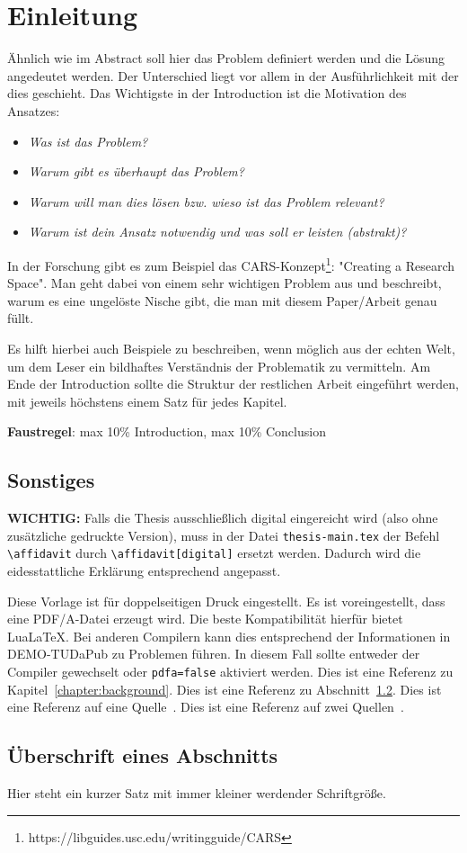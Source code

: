 
\chapter{Einleitung}\label{chapter:introduction}

Ähnlich wie im Abstract soll hier das Problem definiert werden und die Lösung angedeutet werden.
Der Unterschied liegt vor allem in der Ausführlichkeit mit der dies geschieht. 
Das Wichtigste in der Introduction ist die Motivation des Ansatzes: 
\begin{itemize}
	\item \emph{Was ist das Problem?}
	\item \emph{Warum gibt es überhaupt das Problem? }
	\item \emph{Warum will man dies lösen bzw. wieso ist das Problem relevant? }
	\item \emph{Warum ist dein Ansatz notwendig und was soll er leisten (abstrakt)?}
\end{itemize}
In der Forschung gibt es zum Beispiel das CARS-Konzept\footnote{https://libguides.usc.edu/writingguide/CARS}: "Creating a Research Space".
Man geht dabei von einem sehr wichtigen Problem aus und beschreibt, warum es eine ungelöste Nische gibt, die man mit diesem Paper/Arbeit genau füllt.

Es hilft hierbei auch Beispiele zu beschreiben, wenn möglich aus der echten Welt, um dem Leser ein bildhaftes Verständnis der Problematik zu vermitteln.
Am Ende der Introduction sollte die Struktur der restlichen Arbeit eingeführt werden, mit jeweils höchstens einem Satz für jedes Kapitel.

\textbf{Faustregel}: max 10\% Introduction, max 10\% Conclusion


\section{Sonstiges}
\textbf{WICHTIG:} Falls die Thesis ausschließlich digital eingereicht wird (also ohne zusätzliche gedruckte Version), muss in der Datei \texttt{thesis-main.tex} der Befehl \texttt{\textbackslash affidavit} durch \texttt{\textbackslash affidavit[digital]} ersetzt werden.
Dadurch wird die eidesstattliche Erklärung entsprechend angepasst.

Diese Vorlage ist für doppelseitigen Druck eingestellt.
Es ist voreingestellt, dass eine PDF/A-Datei erzeugt wird.
Die beste Kompatibilität hierfür bietet Lua\LaTeX.
Bei anderen Compilern kann dies entsprechend der Informationen in DEMO-TUDaPub zu Problemen führen.
In diesem Fall sollte entweder der Compiler gewechselt oder \texttt{pdfa=false} aktiviert werden.
Dies ist eine Referenz zu Kapitel~\ref{chapter:background}.
Dies ist eine Referenz zu Abschnitt~\ref{sect:dummy-section}.
Dies ist eine Referenz auf eine Quelle~\cite{Luthmann2017}.
Dies ist eine Referenz auf zwei Quellen~\cite{Luthmann2019,Ruland2018}.



\section{Überschrift eines Abschnitts}\label{sect:dummy-section}


{\Huge Hier} {\huge steht} {\LARGE ein} {\Large kurzer} {\large Satz} {\normalsize mit} {\small immer} {\footnotesize kleiner} {\scriptsize werdender} {\tiny Schriftgröße}.